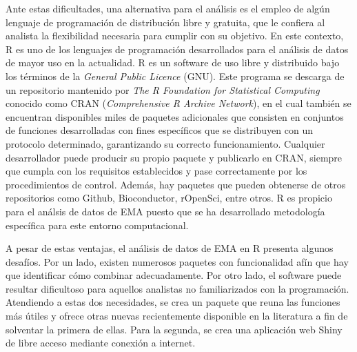Ante estas dificultades, una alternativa para el análisis es el empleo de algún lenguaje de programación de distribución libre y gratuita, que le confiera al analista la flexibilidad necesaria para cumplir con su objetivo. En este contexto, R es uno de los lenguajes de programación desarrollados para el análisis de datos de mayor uso en la actualidad. R es un software de uso libre y distribuido bajo los términos de la \emph{General Public Licence} (GNU). Este programa se descarga de un repositorio mantenido por \emph{The R Foundation for Statistical Computing} conocido como CRAN (\emph{Comprehensive R Archive Network}), en el cual también se encuentran disponibles miles de paquetes adicionales que consisten en conjuntos de funciones desarrolladas con fines específicos que se distribuyen con un protocolo determinado, garantizando su correcto funcionamiento. Cualquier desarrollador puede producir su propio paquete y publicarlo en CRAN, siempre que cumpla con los requisitos establecidos y pase correctamente por los procedimientos de control. Además, hay paquetes que pueden obtenerse de otros repositorios como Github, Bioconductor, rOpenSci, entre otros. R es propicio para el análsis de datos de EMA puesto que se ha desarrollado metodología específica para este entorno computacional. 

A pesar de estas ventajas, el análisis de datos de EMA en R presenta algunos desafíos. Por un lado, existen numerosos paquetes con funcionalidad afín que hay que identificar cómo combinar adecuadamente. Por otro lado, el software puede resultar dificultoso para aquellos analistas no familiarizados con la programación. Atendiendo a estas dos necesidades, se crea un paquete que reuna las funciones más útiles y ofrece otras nuevas recientemente disponible en la literatura a fin de solventar la primera de ellas. Para la segunda, se crea una aplicación web Shiny de libre acceso mediante conexión a internet. 
